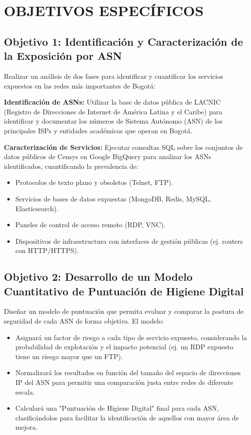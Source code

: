 \section{OBJETIVOS ESPECÍFICOS}
\subsection{Objetivo 1: Identificación y Caracterización de la Exposición por ASN}

Realizar un análisis de dos fases para identificar y cuantificar los servicios expuestos en las redes más importantes de Bogotá:

\textbf{Identificación de ASNs:} Utilizar la base de datos pública de LACNIC (Registro de Direcciones de Internet de América Latina y el Caribe) para identificar y documentar los números de Sistema Autónomo (ASN) de los principales ISPs y entidades académicas que operan en Bogotá.

\textbf{Caracterización de Servicios:} Ejecutar consultas SQL sobre los conjuntos de datos públicos de Censys en Google BigQuery para analizar los ASNs identificados, cuantificando la prevalencia de:
\begin{itemize}
  \item Protocolos de texto plano y obsoletos (Telnet, FTP).
  \item Servicios de bases de datos expuestas (MongoDB, Redis, MySQL, Elasticsearch).
  \item Paneles de control de acceso remoto (RDP, VNC).
  \item Dispositivos de infraestructura con interfaces de gestión públicas (ej. routers con HTTP/HTTPS).
\end{itemize}

\subsection{Objetivo 2: Desarrollo de un Modelo Cuantitativo de Puntuación de Higiene Digital}

Diseñar un modelo de puntuación que permita evaluar y comparar la postura de seguridad de cada ASN de forma objetiva. El modelo:

\begin{itemize}
  \item Asignará un factor de riesgo a cada tipo de servicio expuesto, considerando la probabilidad de explotación y el impacto potencial (ej. un RDP expuesto tiene un riesgo mayor que un FTP).
  \item Normalizará los resultados en función del tamaño del espacio de direcciones IP del ASN para permitir una comparación justa entre redes de diferente escala.
  \item Calculará una "Puntuación de Higiene Digital" final para cada ASN, clasificándolos para facilitar la identificación de aquellos con mayor área de mejora.
\end{itemize}

